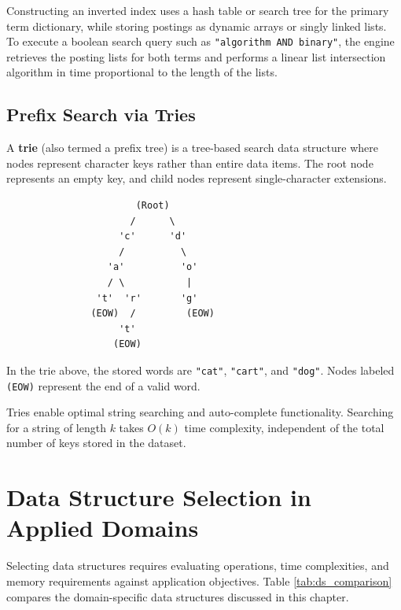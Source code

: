\documentclass[12pt]{report}
\begin{document}
Constructing an inverted index uses a hash table or search tree for the primary term dictionary, while storing postings as dynamic arrays or singly linked lists. To execute a boolean search query such as \texttt{"algorithm AND binary"}, the engine retrieves the posting lists for both terms and performs a linear list intersection algorithm in time proportional to the length of the lists.

\subsection{Prefix Search via Tries}

A \textbf{trie} (also termed a prefix tree) is a tree-based search data structure where nodes represent character keys rather than entire data items. The root node represents an empty key, and child nodes represent single-character extensions.

\begin{verbatim}
                       (Root)
                      /      \
                    'c'      'd'
                    /          \
                  'a'          'o'
                  / \           |
                't'  'r'       'g'
               (EOW)  /         (EOW)
                    't'
                   (EOW)
\end{verbatim}

In the trie above, the stored words are \texttt{"cat"}, \texttt{"cart"}, and \texttt{"dog"}. Nodes labeled \texttt{(EOW)} represent the end of a valid word.

Tries enable optimal string searching and auto-complete functionality. Searching for a string of length $k$ takes $O(k)$ time complexity, independent of the total number of keys stored in the dataset.

\section{Data Structure Selection in Applied Domains}

Selecting data structures requires evaluating operations, time complexities, and memory requirements against application objectives. Table \ref{tab:ds_comparison} compares the domain-specific data structures discussed in this chapter.
\end{document}
